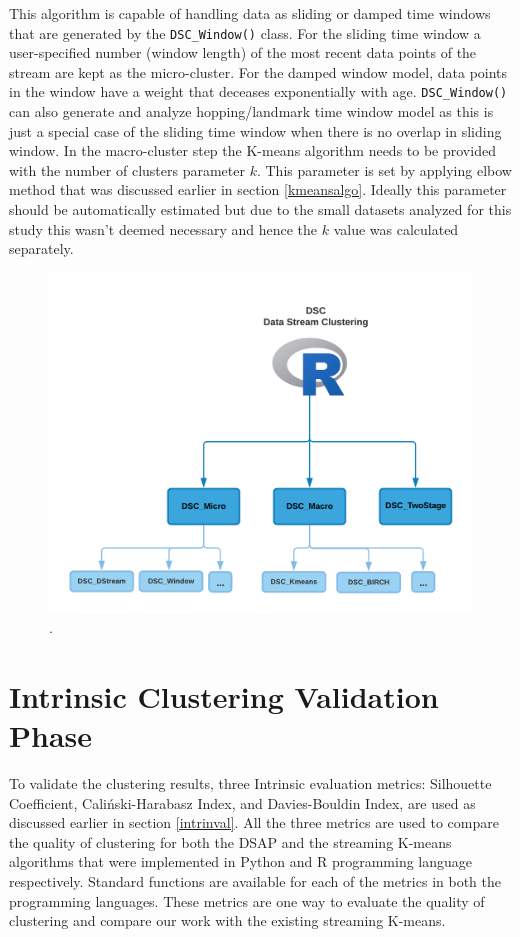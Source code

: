 This algorithm is capable of handling data as sliding or damped time windows that are generated by the \texttt{DSC\_Window()} class. For the sliding time window a user-specified number (window length) of the most recent data points of the stream are kept as the micro-cluster. For the damped window model, data points in the window have a weight that deceases exponentially with age. \texttt{DSC\_Window()} can also generate and analyze hopping/landmark time window model as this is just a special case of the sliding time window when there is no overlap in sliding window. In the macro-cluster step the K-means algorithm needs to be provided with the number of clusters parameter $k$. This parameter is set by applying elbow method that was discussed earlier in section \ref{kmeansalgo}. Ideally this parameter should be automatically estimated but due to the small datasets analyzed for this study this wasn't deemed necessary and hence the $k$ value was calculated separately.

\begin{figure}[]
    \centering
    \includegraphics[width=.7\textwidth]{image/Chapters/Chapter5/DSC_all.png}
    \caption{ .}
    \label{dsc}
\end{figure}




\section{Intrinsic Clustering Validation Phase}
To validate the clustering results, three Intrinsic evaluation metrics: Silhouette Coefficient, Caliński-Harabasz Index, and Davies-Bouldin Index, are used as discussed earlier in section \ref{intrinval}. All the three metrics are used to compare the quality of clustering for both the DSAP and the streaming K-means algorithms that were implemented in Python and R programming language  respectively. Standard functions are available for each of the metrics in both the programming languages. These metrics are one way to evaluate the quality of clustering and compare our work with the existing streaming K-means.


